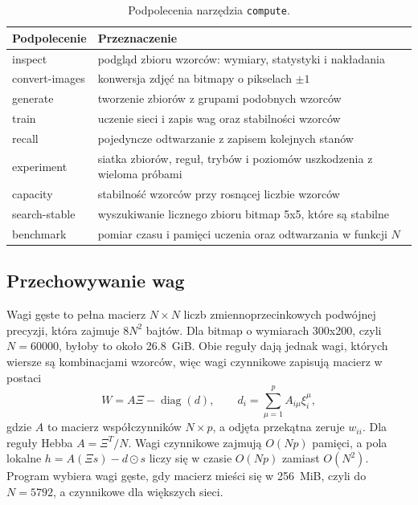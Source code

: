 \begin{table}[H]
    \centering
    \caption{Podpolecenia narzędzia \texttt{compute}.}
    \label{tab:podpolecenia}
    \small
    \begin{tabularx}{\textwidth}{>{\ttfamily}l X}
        \toprule
        \normalfont Podpolecenie & Przeznaczenie \\
        \midrule
        inspect & podgląd zbioru wzorców: wymiary, statystyki i nakładania \\
        convert-images & konwersja zdjęć na bitmapy o pikselach $\pm 1$ \\
        generate & tworzenie zbiorów z grupami podobnych wzorców \\
        train & uczenie sieci i zapis wag oraz stabilności wzorców \\
        recall & pojedyncze odtwarzanie z zapisem kolejnych stanów \\
        experiment & siatka zbiorów, reguł, trybów i poziomów uszkodzenia z wieloma próbami \\
        capacity & stabilność wzorców przy rosnącej liczbie wzorców \\
        search-stable & wyszukiwanie licznego zbioru bitmap \mbox{5x5}, które są stabilne \\
        benchmark & pomiar czasu i pamięci uczenia oraz odtwarzania w funkcji $N$ \\
        \bottomrule
    \end{tabularx}
\end{table}

\subsection{Przechowywanie wag}
\label{sec:wagi}

Wagi gęste to pełna macierz $N \times N$ liczb zmiennoprzecinkowych podwójnej precyzji, która zajmuje $8N^2$ bajtów. Dla bitmap o wymiarach \mbox{300x200}, czyli $N = \num{60000}$, byłoby to około \qty{26.8}{GiB}. Obie reguły dają jednak wagi, których wiersze są kombinacjami wzorców, więc wagi czynnikowe zapisują macierz w postaci
\begin{equation}
    W = A \Xi - \operatorname{diag}(d), \qquad d_i = \sum_{\mu=1}^{p} A_{i\mu} \xi^\mu_i,
    \label{eq:wagi-czynnikowe}
\end{equation}
gdzie $A$ to macierz współczynników $N \times p$, a odjęta przekątna zeruje $w_{ii}$. Dla reguły Hebba $A = \Xi^T / N$. Wagi czynnikowe zajmują $O(Np)$ pamięci, a pola lokalne $h = A(\Xi s) - d \odot s$ liczy się w czasie $O(Np)$ zamiast $O(N^2)$. Program wybiera wagi gęste, gdy macierz mieści się w \qty{256}{MiB}, czyli do $N = 5792$, a czynnikowe dla większych sieci.

